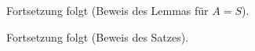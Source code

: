\begin{bewe}
\begin{bewe}

Fortsetzung folgt (Beweis des Lemmas für $A = S$).

\end{bewe}

Fortsetzung folgt (Beweis des Satzes).

\end{bewe}